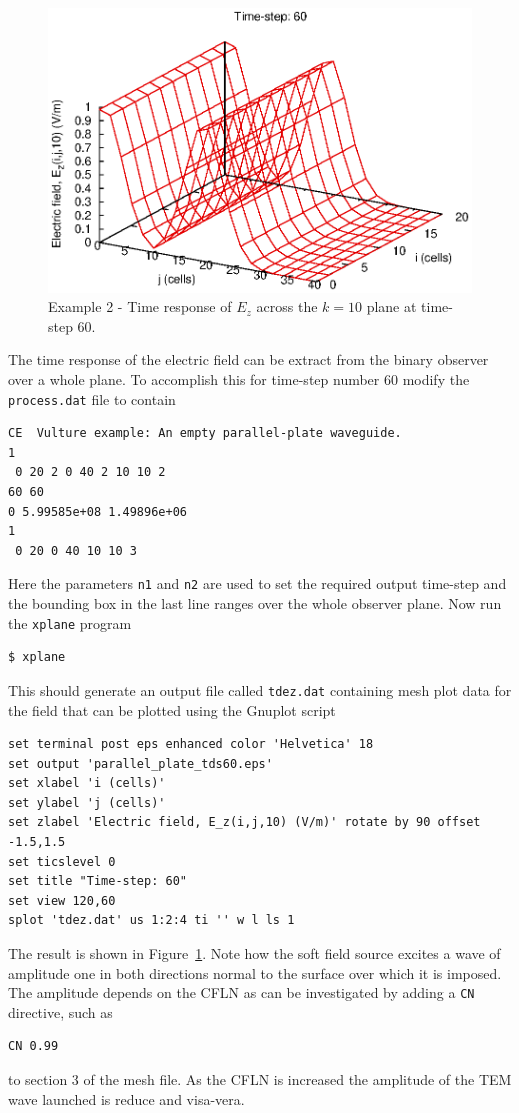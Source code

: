 \documentclass[onecolumn,a4paper]{article}
\numberwithin{equation}{section}
\begin{document}
\begin{figure}[ht]
 \centerline{\includegraphics[width=12cm]{figures/parallel_plate_tds60}}
 \caption{\label{fg:parallel_plate_tds} Example 2 - Time response of $E_z$ across the $k=10$ plane at time-step 60.}
\end{figure}

The time response of the electric field can be extract from the binary observer
over a whole plane. To accomplish this for time-step number 60 modify the 
\texttt{process.dat} file to contain
\begin{verbatim}
CE  Vulture example: An empty parallel-plate waveguide.
1
 0 20 2 0 40 2 10 10 2
60 60
0 5.99585e+08 1.49896e+06
1
 0 20 0 40 10 10 3
\end{verbatim}
Here the parameters \texttt{n1} and \texttt{n2} are used to set the required output time-step
and the bounding box in the last line ranges over the whole observer plane.
Now run the \texttt{xplane} program
\begin{verbatim}
$ xplane
\end{verbatim}
This should generate an output file called \texttt{tdez.dat} containing mesh plot
data for the field that can be plotted using the Gnuplot script
\begin{verbatim}
set terminal post eps enhanced color 'Helvetica' 18
set output 'parallel_plate_tds60.eps'
set xlabel 'i (cells)'
set ylabel 'j (cells)'
set zlabel 'Electric field, E_z(i,j,10) (V/m)' rotate by 90 offset -1.5,1.5
set ticslevel 0
set title "Time-step: 60"
set view 120,60
splot 'tdez.dat' us 1:2:4 ti '' w l ls 1
\end{verbatim}
The result is shown in Figure~\ref{fg:parallel_plate_tds}. Note how the soft field source
excites a wave of amplitude one in both directions normal to the surface over which it is 
imposed. The amplitude depends on the CFLN as can be investigated by adding a \texttt{CN}
directive, such as
\begin{verbatim}
CN 0.99
\end{verbatim}
to section 3 of the mesh file. As the CFLN is increased the amplitude of the TEM wave
launched is reduce and visa-vera. 
\end{document}

